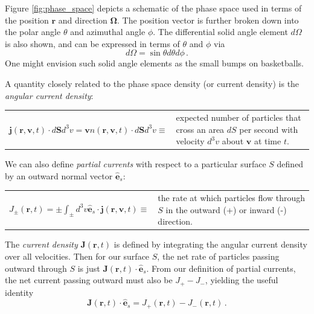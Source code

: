Figure \ref{fig:phase_space} depicts a schematic of the phase space used in terms of the position $\mathbf{r}$ and direction $\mathbf{\Omega}$.  The position vector is further broken down into the polar angle $\theta$ and azimuthal angle $\phi$.  The differential solid angle element $d\Omega$ is also shown, and can be expressed in terms of $\theta$ and $\phi$ via
\begin{equation*}
 d\Omega = \sin{\theta} d\theta d\phi \, .
\end{equation*}  
One might envision such solid angle elements as the small bumps on basketballs.  

A quantity closely related to the phase space density (or current density) is the \textit{angular current density}:
\begin{center}
  \begin{tabular}{cp{5.0cm}}
    $\mathbf{j}(\mathbf{r},\mathbf{v},t)\cdot d\mathbf{S} d^3v = \mathbf{v} n(\mathbf{r},\mathbf{v},t) \cdot d\mathbf{S} d^3v \equiv $ &
    expected number of particles that cross an area $dS$ per second with velocity $d^3v$ about $\mathbf{v}$ at time $t$.
  \end{tabular}
\end{center}

We can also define \textit{partial currents} with respect to a particular surface $S$ defined by an outward normal vector $\mathbf{\hat{e}}_s$:

\begin{center}
  \begin{tabular}{cp{5.0cm}}
    $J_{\pm}(\mathbf{r},t) = \pm \int_{\pm} d^3v  \mathbf{\hat{e}}_s \cdot \mathbf{j} (\mathbf{r},\mathbf{v},t) \equiv $ &
   the rate at which particles flow through $S$ in the outward (+) or inward (-) direction.
  \end{tabular}
\end{center}

The \textit{current density} $\mathbf{J}(\mathbf{r},t)$ is defined by integrating the angular current density over all velocities.  Then for our surface $S$, the net rate of particles passing outward through $S$ is just $\mathbf{J}(\mathbf{r},t) \cdot \mathbf{\hat{e}}_s$.  From our definition of partial currents, the net current passing outward must also be $J_+ - J_-$, yielding the useful identity
\begin{equation}
 \mathbf{J}(\mathbf{r},t) \cdot \mathbf{\hat{e}}_s = J_{+}(\mathbf{r},t) - J_{-}(\mathbf{r},t) \, .
\end{equation}

